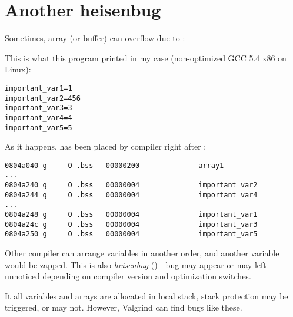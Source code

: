 \section{Another heisenbug}

Sometimes, array (or buffer) can overflow due to :



This is what this program printed in my case (non-optimized GCC 5.4 x86 on Linux):

\begin{lstlisting}
important_var1=1
important_var2=456
important_var3=3
important_var4=4
important_var5=5
\end{lstlisting}

As it happens,  has been placed by compiler right after :

\begin{lstlisting}[caption=objdump -x]
0804a040 g     O .bss   00000200              array1
...
0804a240 g     O .bss   00000004              important_var2
0804a244 g     O .bss   00000004              important_var4
...
0804a248 g     O .bss   00000004              important_var1
0804a24c g     O .bss   00000004              important_var3
0804a250 g     O .bss   00000004              important_var5
\end{lstlisting}

Other compiler can arrange variables in another order, and another variable would be zapped.
This is also \textit{heisenbug} ()---bug may appear or may left unnoticed
depending on compiler version and optimization switches.

It all variables and arrays are allocated in local stack, stack protection may be triggered, or may not.
However, Valgrind can find bugs like these.

